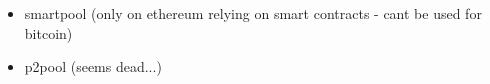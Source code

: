 \begin{itemize}
  \item smartpool (only on ethereum relying on smart contracts - cant be used for bitcoin)
  \item p2pool (seems dead...)
\end{itemize}